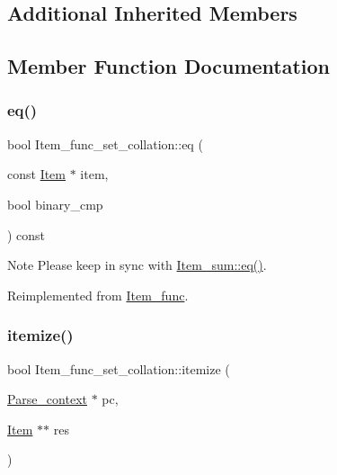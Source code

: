 \subsection*{Additional Inherited Members}


\subsection{Member Function Documentation}
\mbox{\label{classItem__func__set__collation_acaa06875a0860b9553adb983201e067f}} 
\subsubsection{\texorpdfstring{eq()}{eq()}}
{\footnotesize\ttfamily bool Item\+\_\+func\+\_\+set\+\_\+collation\+::eq (\begin{DoxyParamCaption}\item[{const \mbox{\hyperlink{classItem}{Item}} $\ast$}]{item,  }\item[{bool}]{binary\+\_\+cmp }\end{DoxyParamCaption}) const\hspace{0.3cm}{\ttfamily [virtual]}}

\begin{DoxyNote}{Note}
Please keep in sync with \mbox{\hyperlink{classItem__sum_aeab749252b834e0be4f00aac8ca523f5}{Item\+\_\+sum\+::eq()}}. 
\end{DoxyNote}


Reimplemented from \mbox{\hyperlink{classItem__func_a3de3f23377e6f0006dfccd375086365f}{Item\+\_\+func}}.

\mbox{\label{classItem__func__set__collation_afba6fcb692db9783367474887f17f801}} 
\subsubsection{\texorpdfstring{itemize()}{itemize()}}
{\footnotesize\ttfamily bool Item\+\_\+func\+\_\+set\+\_\+collation\+::itemize (\begin{DoxyParamCaption}\item[{\mbox{\hyperlink{structParse__context}{Parse\+\_\+context}} $\ast$}]{pc,  }\item[{\mbox{\hyperlink{classItem}{Item}} $\ast$$\ast$}]{res }\end{DoxyParamCaption})\hspace{0.3cm}{\ttfamily [virtual]}}

